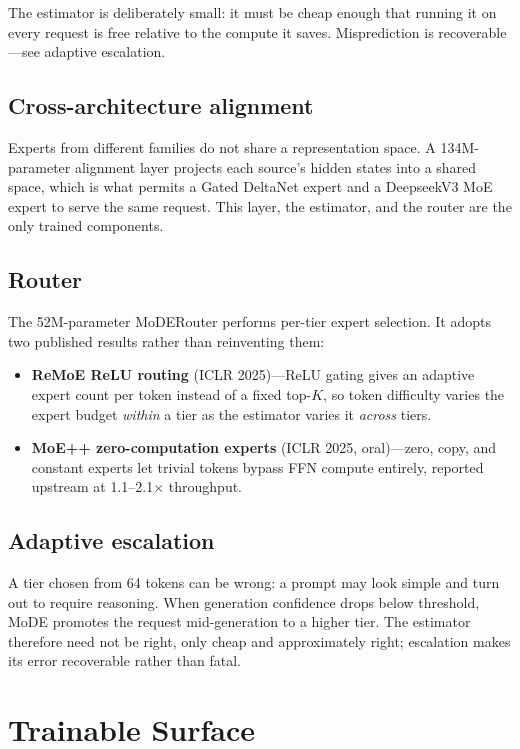 \documentclass[11pt,a4paper]{article}
\begin{document}
The estimator is deliberately small: it must be cheap enough that running it on every
request is free relative to the compute it saves. Misprediction is recoverable---see
adaptive escalation.

\subsection{Cross-architecture alignment}

Experts from different families do not share a representation space. A 134M-parameter
alignment layer projects each source's hidden states into a shared space, which is what
permits a Gated DeltaNet expert and a DeepseekV3 MoE expert to serve the same request.
This layer, the estimator, and the router are the only trained components.

\subsection{Router}

The 52M-parameter MoDERouter performs per-tier expert selection. It adopts two published
results rather than reinventing them:

\begin{itemize}
  \item \textbf{ReMoE ReLU routing} (ICLR 2025)---ReLU gating gives an adaptive expert
        count per token instead of a fixed top-$K$, so token difficulty varies the
        expert budget \emph{within} a tier as the estimator varies it \emph{across}
        tiers.
  \item \textbf{MoE++ zero-computation experts} (ICLR 2025, oral)---zero, copy, and
        constant experts let trivial tokens bypass FFN compute entirely, reported
        upstream at 1.1--2.1$\times$ throughput.
\end{itemize}

\subsection{Adaptive escalation}

A tier chosen from 64 tokens can be wrong: a prompt may look simple and turn out to
require reasoning. When generation confidence drops below threshold, MoDE promotes the
request mid-generation to a higher tier. The estimator therefore need not be right, only
cheap and approximately right; escalation makes its error recoverable rather than fatal.

\section{Trainable Surface}
\end{document}
